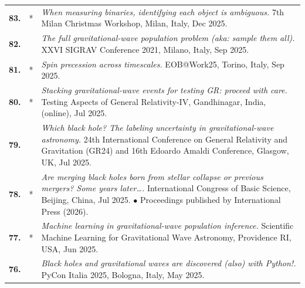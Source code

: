 {\begin{longtable}{rp{0.3cm}p{15.8cm}}
%
\textbf{83.} & * & \textit{When measuring binaries, identifying each object is ambiguous.}
\newline{}
7th Milan Christmas Workshop, Milan, Italy, Dec 2025.
\vspace{0.05cm}\\
%
\textbf{82.} &  & \textit{The full gravitational-wave population problem (aka: sample them all).}
\newline{}
XXVI SIGRAV Conference 2021, Milano, Italy, Sep 2025.
\vspace{0.05cm}\\
%
\textbf{81.} & * & \textit{Spin precession across timescales.}
\newline{}
EOB@Work25, Torino, Italy, Sep 2025.
\vspace{0.05cm}\\
%
\textbf{80.} & * & \textit{Stacking gravitational-wave events for testing GR: proceed with care.}
\newline{}
Testing Aspects of General Relativity-IV, Gandhinagar, India, (online), Jul 2025.
\vspace{0.05cm}\\
%
\textbf{79.} &  & \textit{Which black hole? The labeling uncertainty in gravitational-wave astronomy.}
\newline{}
24th International Conference on General Relativity and Gravitation (GR24) and 16th Edoardo Amaldi Conference, Glasgow, UK, Jul 2025.
\vspace{0.05cm}\\
%
\textbf{78.} & * & \textit{Are merging black holes born from stellar collapse or previous mergers? Some years later….}
\newline{}
International Congress of Basic Science, Beijing, China, Jul 2025.
\newline{}
\textcolor{color1}{$\bullet$} Proceedings published by International Press (2026).
\vspace{0.05cm}\\
%
\textbf{77.} & * & \textit{Machine learning in gravitational-wave population inference.}
\newline{}
Scientific Machine Learning for Gravitational Wave Astronomy, Providence RI, USA, Jun 2025.
\vspace{0.05cm}\\
%
\textbf{76.} &  & \textit{Black holes and gravitational waves are discovered (also) with Python!.}
\newline{}
PyCon Italia 2025, Bologna, Italy, May 2025.
\vspace{0.05cm}\\

\end{longtable}}
